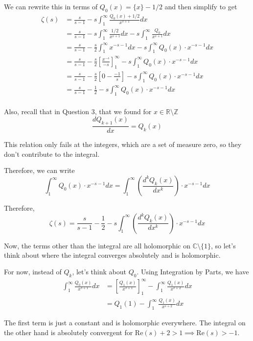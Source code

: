 \documentclass{article}
\newcommand{\R}{\mathbb{R}}
\newcommand{\C}{\mathbb{C}}
\begin{document}
We can rewrite this in terms of $Q_0(x) = \{x\} - 1/2$ and then simplify to get 
\begin{align*}
  \zeta(s) &= \frac{s}{s-1} - s\int_{1}^{\infty} \frac{Q_0(x) + 1/2}{x^{s+1}} dx \\
  &= \frac{s}{s-1} - s \int_1^{\infty} \frac{1/2}{x^{s+1}} dx - s\int_{1}^{\infty} \frac{Q_0}{x^{s+1}} dx \\
  &= \frac{s}{s-1} - \frac{s}{2} \int_1^{\infty} x^{-s-1} dx - s\int_{1}^{\infty} Q_0(x) \cdot x^{-s-1} dx \\
  &= \frac{s}{s-1} - \frac{s}{2} \left[ \frac{x^{-s}}{-s} \right]_{1}^{\infty} - s \int_{1}^{\infty} Q_0(x) \cdot x^{-s-1} dx \\
  &= \frac{s}{s-1} - \frac{s}{2} \left[0 - \frac{-1}{s} \right] - s \int_{1}^{\infty} Q_0(x) \cdot x^{-s-1} dx \\
  &= \frac{s}{s-1} - \frac{1}{2} - s \int_{1}^{\infty} Q_0(x) \cdot x^{-s-1} dx \\
\end{align*}

Also, recall that in Question 3, that we found for $x \in \R \setminus \mathbb{Z}$
\[ \frac{dQ_{k+1}(x)}{dx} = Q_{k}(x) \]

This relation only fails at the integers, which are a set of measure zero, so they don't contribute to the integral.

\vskip 0.25cm
Therefore, we can write 
\[ \int_{1}^{\infty} Q_0(x) \cdot x^{-s-1} dx = \int_{1}^{\infty} \left( \frac{d^k Q_{k}(x)}{dx^k} \right)\cdot x^{-s-1} dx \]

\vskip 0.5cm
Therefore, 
\[ \boxed{ \zeta(s) = \frac{s}{s-1} - \frac{1}{2} - s\int_{1}^{\infty} \left( \frac{d^k Q_{k}(x)}{dx^k} \right)\cdot x^{-s-1} dx} \]

\vskip 0.5cm
Now, the terms other than the integral are all holomorphic on $\C \setminus \{1\}$, so let's think about where the integral converges absolutely and is holomorphic.

For now, instead of $Q_k$, let's think about $Q_0$. Using Integration by Parts, we have 
\begin{align*}
  \int_1^{\infty} \frac{Q_0(x)}{x^{s+1}} dx &= \left[ \frac{Q_1(x)}{x^{s+1}} \right]_{1}^{\infty} - \int_1^{\infty} \frac{Q_1(x)}{x^{s+2}} dx \\
  &= Q_1(1) - \int_{1}^{\infty} \frac{Q_1(x)}{x^{s+2}} dx
\end{align*}

The first term is just a constant and is holomorphic everywhere. The integral on the other hand is absolutely convergent for Re$(s) + 2 > 1 \implies \text{Re}(s) > -1$.
\end{document}
